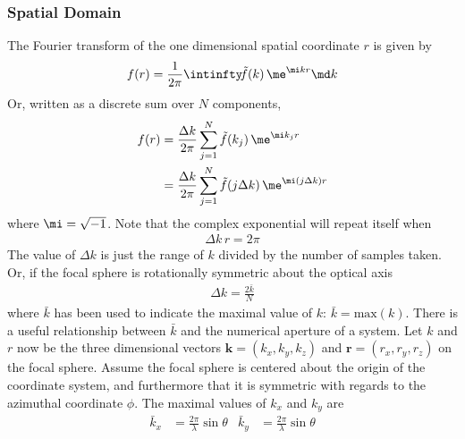 \subsubsection{Spatial Domain}
The Fourier transform of the one dimensional spatial coordinate $r$ is
given by 
\begin{align}
f(r)=\frac{1}{2 \pi} \intinfty\!\tilde{f}(k)\,\me^{\mi kr}\md k
\end{align}
Or, written as a discrete sum over $N$ components, 
\begin{align}
f(r)&=\frac{\Delta k}{2 \pi}\sum_{j=1}^{N}\tilde{f}(k_j)\,\me^{\mi k_j r}\\
&=\frac{\Delta k}{2 \pi}\sum_{j=1}^{N}\tilde{f}(j\Delta k)\,\me^{\mi (j\Delta k) r}
\end{align}
where $\mi=\sqrt{-1}$.  Note that the complex exponential will repeat itself when
\begin{align}
\Delta k\, r=2\pi
\label{eqn:samplingperiod}
\end{align}
The value of $\Delta k$ is just the range of $k$ divided by the number of
samples taken.  Or, if the focal sphere is rotationally symmetric about
the optical axis
\begin{align}
\Delta k = \frac{2\bar{k}}{N}
\label{eqn:deltak}
\end{align}
where $\bar{k}$ has been used to indicate the maximal value of $k$: 
$\bar{k}=\mathrm{max}(k)$.  There is a useful relationship between
$\bar{k}$ and the numerical aperture of a system.  Let $k$ and $r$ now be
the three dimensional vectors  $\mathbf{k}=(k_x,k_y,k_z)$ and
$\mathbf{r}=(r_x,r_y,r_z)$ on the focal sphere.  Assume the focal sphere is
centered about the origin of the coordinate system, and furthermore that it
is symmetric with regards to the azimuthal coordinate $\phi$.  
The maximal values of $k_x$ and $k_y$ are
\begin{align}
\bar{k}_x&=\frac{2\pi}{\lambda}\sin\theta&
\bar{k}_y&=\frac{2\pi}{\lambda}\sin\theta
\end{align}


